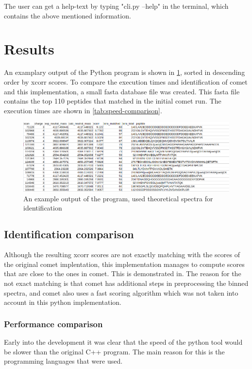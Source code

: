 \documentclass[11pt]{article}
\begin{document}
The user can get a help-text by typing "cli.py --help" in the terminal, which contains the above mentioned information.

\section{Results}
An examplary output of the Python program is shown in \cref{fig:output}, sorted in descending order by xcorr scores.
To compare the execution times and identification of comet and this implementation, a small fasta database file was created. This fasta file contains the top 110 peptides that matched in the initial comet run. The execution times are shown in \cref{tab:speed-comparison}.
\begin{figure}[ht]
\centering
\includegraphics[width=1\textwidth]{figs/output.png}
\caption{An example output of the program, used theoretical spectra for identification}
\label{fig:output}
\end{figure}

\subsection{Identification comparison}
Although the resulting xcorr scores are not exactly matching with the scores of the original comet implentation, this implementation manages to compute scores that are close to the ones in comet. This is demonstrated in. The reason for the not exact matching is that comet has additional steps in preprocessing the binned spectra, and comet also uses a fast scoring algorithm which was not taken into account in this python implementation. 

\subsubsection{Performance comparison}
Early into the development it was clear that the speed of the python tool would be slower than the original C++ program. The main reason for this is the programming languages that were used. 
\end{document}
